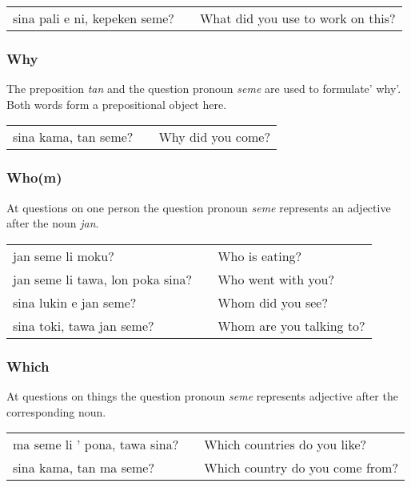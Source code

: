 \begin{supertabular}{p{5,5cm}|ll}
sina pali e ni, kepeken seme? &&  What did you use to work on this? \\
\end{supertabular} 

\subsubsection*{Why}
%
The preposition \textit{tan} and the question pronoun \textit{seme} are used to formulate' why'. 
Both words form a prepositional object here.

\begin{supertabular}{p{5,5cm}|ll}
sina kama, tan seme? && Why did you come? \\
\end{supertabular} 

\subsubsection*{Who(m)}
%
At questions on one person the question pronoun \textit{seme} represents an adjective after the noun \textit{jan}. 

\begin{supertabular}{p{5,5cm}|ll}
jan seme li moku? && Who is eating? \\
jan seme li tawa, lon poka sina? && Who went with you? \\
sina lukin e jan seme? && Whom did you see? \\
sina toki, tawa jan seme? && Whom are you talking to? \\
\end{supertabular} 
%
\subsubsection*{Which}
%
At questions on things the question pronoun \textit{seme} represents adjective after the corresponding noun. 

\begin{supertabular}{p{5,5cm}|ll}
ma seme li ' pona, tawa sina? && Which countries do you like? \\
sina kama, tan ma seme? && Which country do you come from? \\ 
\end{supertabular} 


